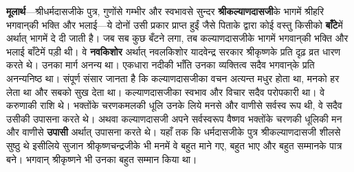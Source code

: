 \begin{sloppypar}\justifying{}
\textbf{मूलार्थ}—श्रीधर्मदासजीके पुत्र, गुणोंसे गम्भीर और स्वभावसे सुन्दर \textbf{श्रीकल्याण\-दासजी}के भागमें श्रीहरि भगवान्‌की भक्ति और भलाई—ये दोनों उसी प्रकार प्राप्त हुईं जैसे पिताके द्वारा कोई वस्तु किसीको \textbf{बाँटे}में अर्थात् भागमें दे दी जाती है। जब सब कुछ बँटने लगा, तब कल्याण\-दासजीके भागमें भगवान्‌की भक्ति और भलाई बाँटेमें पड़ी थी। वे \textbf{नवकिशोर} अर्थात् नवलकिशोर यादवेन्द्र सरकार श्रीकृष्णके प्रति दृढ़ व्रत धारण करते थे। उनका मार्ग अनन्य था। एकधारा नदीकी भाँति उनका व्यक्तित्व सदैव भगवान्‌के प्रति अनन्यनिष्ठ था। संपूर्ण संसार जानता है कि कल्याण\-दासजीका वचन अत्यन्त मधुर होता था, मनको हर लेता था और सबको सुख देता था। कल्याण\-दासजीका स्वभाव और विचार सदैव परोपकारी था। वे करुणाकी राशि थे। भक्तोंके चरणकमलकी धूलि उनके लिये मनसे और वाणीसे सर्वस्व रूप थी, वे सदैव उसीकी उपासना करते थे। अथवा कल्याण\-दासजी अपने सर्वस्वरूप वैष्णव भक्तोंके चरणकी धूलिकी मन और वाणीसे \textbf{उपासी} अर्थात् उपासना करते थे। यहाँ तक कि धर्मदासजीके पुत्र श्रीकल्याण\-दासजी शीलसे सुष्ठु थे इसीलिये सुजान श्रीकृष्ण\-चन्द्रजीके भी मनमें वे बहुत माने गए, बहुत भाए और बहुत सम्मानके पात्र बने। भगवान् श्रीकृष्णने भी उनका बहुत सम्मान किया था।
\end{sloppypar}


